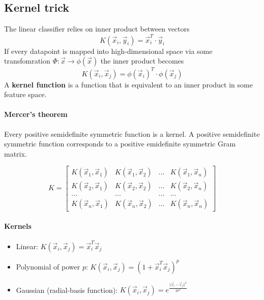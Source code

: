 \documentclass[a4paper,6pt,twocolumn,fleqn]{article}
\begin{document}
\subsection{Kernel trick} %
The linear classifier relies on inner product between vectors
\begin{equation}
    K(\vec x_i, \vec y_i) = \vec x_i^T \cdot \vec y_i
\end{equation}
If every datapoint is mapped into high-dimensional space via some transfomration \(\Phi: \vec x \to \phi(\vec x)\) the inner product becomes
\begin{equation}
    K(\vec x_i, \vec x_j) = \phi(\vec x_i)^T \cdot \phi(\vec x_j)
\end{equation}
A \textbf{kernel function} is a function that is equivalent to an inner product in some feature space.

\paragraph{Mercer's theorem} Every positive semidefinite symmetric function is a kernel. A positive semidefinite symmetric function corresponds to a positive emidefinite symmetric Gram matrix.

\begin{equation}
    K = 
    \begin{bmatrix}
        K(\vec{x}_1,\vec{x}_1) & K(\vec{x}_1,\vec{x}_2) & ... & K(\vec{x}_1,\vec{x}_n) \\
        K(\vec{x}_2,\vec{x}_1) & K(\vec{x}_2,\vec{x}_2) & ... & K(\vec{x}_2,\vec{x}_n) \\
        ... & ... & ... & ... \\
        K(\vec{x}_n,\vec{x}_1) & K(\vec{x}_n,\vec{x}_2) & ... & K(\vec{x}_n,\vec{x}_n) 
    \end{bmatrix}
\end{equation}

\paragraph{Kernels}
\begin{itemize}
    \item Linear: \(K(\vec{x}_i,\vec{x}_j) = \vec{x}_i^T\vec{x}_j\)
    \item Polynomial of power \(p\): \(K(\vec{x}_i,\vec{x}_j) = (1 + \vec{x}_i^T \vec{x}_j)^p\)
    \item Gaussian (radial-basis function): \(K(\vec{x}_i,\vec{x}_j) = e^{\frac {||\vec{x}_i - \vec{x}_j||^2} {2 \sigma^2}}\)
\end{itemize}
\end{document}
